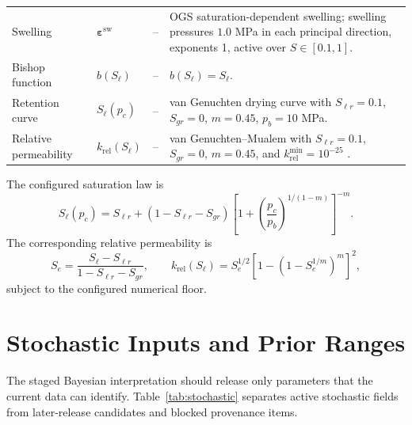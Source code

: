 \documentclass[10pt,a4paper]{article}
\newcommand{\pcap}{p_c}
\newcommand{\Sat}{S_\ell}
\newcommand{\krel}{k_{\mathrm{rel}}}
\begin{document}
\begin{longtable}{@{}L{0.23\textwidth}L{0.13\textwidth}L{0.14\textwidth}Y@{}}
Swelling & \(\bm\varepsilon^{\mathrm{sw}}\) & -- & OGS saturation-dependent swelling; swelling pressures \(1.0\) MPa in each principal direction, exponents 1, active over \(S\in[0.1,1]\). \\
Bishop function & \(b(\Sat)\) & -- & \(b(\Sat)=\Sat\). \\
Retention curve & \(\Sat(\pcap)\) & -- & van Genuchten drying curve with \(S_{\ell r}=0.1\), \(S_{gr}=0\), \(m=0.45\), \(p_b=10\) MPa. \\
Relative permeability & \(\krel(\Sat)\) & -- & van Genuchten--Mualem with \(S_{\ell r}=0.1\), \(S_{gr}=0\), \(m=0.45\), and \(k_{\mathrm{rel}}^{\min}=10^{-25}\) \citep{VanGenuchten1980}. \\
\end{longtable}

The configured saturation law is
\[
\Sat(\pcap)=S_{\ell r}+(1-S_{\ell r}-S_{gr})
\left[1+\left(\frac{\pcap}{p_b}\right)^{1/(1-m)}\right]^{-m}.
\]
The corresponding relative permeability is
\[
S_e=\frac{\Sat-S_{\ell r}}{1-S_{\ell r}-S_{gr}}, \qquad
\krel(\Sat)=S_e^{1/2}\left[1-\left(1-S_e^{1/m}\right)^m\right]^2,
\]
subject to the configured numerical floor.

\section{Stochastic Inputs and Prior Ranges}

The staged Bayesian interpretation should release only parameters that the current
data can identify.  Table~\ref{tab:stochastic} separates active stochastic fields
from later-release candidates and blocked provenance items.
\end{document}
